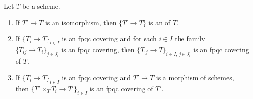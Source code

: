 \begin{lemma}
\label{lem:pc-fpqc-covering-stability}
Let $T$ be a scheme.
\begin{enumerate}
\item If $T'\to T$ is an isomorphism, then $\{T'\to T\}$ is an
 of $T$.
\item If $\{T_i\to T\}_{i\in I}$ is an fpqc covering and for each $i\in I$
the family $\{T_{ij}\to T_i\}_{j\in J_i}$ is an fpqc covering, then
$\{T_{ij}\to T\}_{i\in I,\,j\in J_i}$ is an fpqc covering of $T$.
\item If $\{T_i\to T\}_{i\in I}$ is an fpqc covering and $T'\to T$ is a
morphism of schemes, then $\{T'\times_TT_i\to T'\}_{i\in I}$ is an fpqc
covering of $T'$.
\end{enumerate}

\end{lemma}
